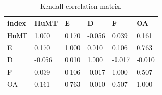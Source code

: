 \begin{table}[t]
\centering
\caption{Kendall correlation matrix.}
\label{tab:corr_kendall}
\begin{tabular}{llllll}
\toprule
index & HuMT & E & D & F & OA \\
\midrule
HuMT & 1.000 & 0.170 & -0.056 & 0.039 & 0.161 \\
E & 0.170 & 1.000 & 0.010 & 0.106 & 0.763 \\
D & -0.056 & 0.010 & 1.000 & -0.017 & -0.010 \\
F & 0.039 & 0.106 & -0.017 & 1.000 & 0.507 \\
OA & 0.161 & 0.763 & -0.010 & 0.507 & 1.000 \\
\bottomrule
\end{tabular}
\end{table}
